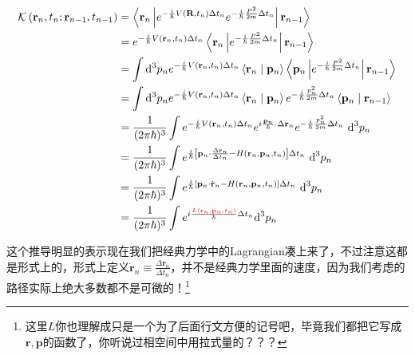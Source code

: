 \documentclass[a4paper,zihao=-4,linespread=1]{ctexrep}
\begin{document}
	\begin{equation}
		\label{eq:6.86}
	\begin{aligned}
		\mathcal{K}\left(\mathbf{r}_{n}, t_{n} ; \mathbf{r}_{n-1}, t_{n-1}\right) & = \left\langle\mathbf{r}_{n}\left|e^{-\frac{i}{\hbar} V\left(\mathbf{R}, t_{n}\right) \Delta t_{n}} e^{-\frac{i}{\hbar} \frac{P^{2}}{2 m} \Delta t_{n}}\right| \mathbf{r}_{n-1}\right\rangle \\ & = e^{-\frac{i}{\hbar} V\left(\mathbf{r}_{n}, t_{n}\right) \Delta t_{n}}\left\langle\mathbf{r}_{n}\left|e^{-\frac{i}{\hbar} \frac{P^{2}}{2 m} \Delta t_{n}}\right| \mathbf{r}_{n-1}\right\rangle \\ & = \int \mathrm{d}^3p_n e^{-\frac{i}{\hbar} V\left(\mathbf{r}_{n}, t_{n}\right) \Delta t_{n}}\left\langle\mathbf{r}_{n} \mid \mathbf{p}_{n}\right\rangle\left\langle\mathbf{p}_{n}\left|e^{-\frac{i}{\hbar} \frac{P^{2}}{2 m} \Delta t_{n}}\right| \mathbf{r}_{n-1}\right\rangle \\ & = \int \mathrm{d}^3p_n e^{-\frac{i}{\hbar} V\left(\mathbf{r}_{n}, t_{n}\right) \Delta t_{n}}\left\langle\mathbf{r}_{n} \mid \mathbf{p}_{n}\right\rangle e^{-\frac{i}{\hbar} \frac{p_{n}^{2}}{2 m} \Delta t_{n}}\left\langle\mathbf{p}_{n} \mid \mathbf{r}_{n-1}\right\rangle \\
		 & = \frac{1}{(2 \pi \hbar)^{3}} \int e^{-\frac{i}{\hbar} V\left(\mathbf{r}_{n}, t_{n}\right) \Delta t_{n}} e^{i \frac{\mathbf{p}_{n}}{\hbar} \cdot \Delta \mathbf{r}_{n}} e^{-\frac{i}{\hbar} \frac{p_{n}^{2}}{2 m} \Delta t_{n}} \mathrm{~d}^3{p}_{n} \\ & = \frac{1}{(2 \pi \hbar)^{3}} \int e^{\frac{i}{\hbar}\left[\mathbf{p}_{n} \cdot \frac{\Delta \mathbf{r}_{n}}{\Delta t_{n}}-H\left(\mathbf{r}_{n}, \mathbf{p}_{n}, t_{n}\right)\right] \Delta t_{n}} \mathrm{~d} ^3{p}_{n} \\ & = \frac{1}{(2 \pi \hbar)^{3}} \int e^{\frac{i}{\hbar}\left[\mathbf{p}_{n} \cdot \dot{\mathbf{r}}_{n}-H\left(\mathbf{r}_{n}, \mathbf{p}_{n}, t_{n}\right)\right] \Delta t_{n}} \mathrm{~d}^3{p}_{n} \\ & = \frac{1}{(2 \pi \hbar)^{3}} \int e^{i \frac{{\color{red}L\left(\mathbf{r}_{n}, \mathbf{p}_{n}, t_{n}\right)} }{\hbar}\Delta t_{n}} \mathrm{d}^3{p}_{n}
	\end{aligned}
	\end{equation}
	
	这个推导明显的表示现在我们把经典力学中的Lagrangian凑上来了，不过注意这都是形式上的，形式上定义$\dot{\mathbf{r}}_{n}\equiv \frac{\Delta \mathbf{r}_{n}}{\Delta t_{n}}$，并不是经典力学里面的速度，因为我们考虑的路径实际上绝大多数都不是可微的！\footnote{这里$L$你也理解成只是一个为了后面行文方便的记号吧，毕竟我们都把它写成$\mathbf{r},\mathbf{p}$的函数了，你听说过相空间中用拉式量的？？？}
	
\end{document}
